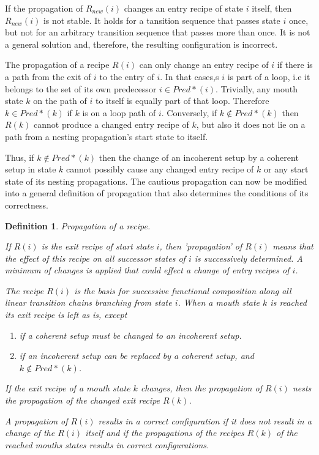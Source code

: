 \documentclass[12pt,a4paper]{scrartcl}
\newtheorem{definition}{Definition}
\begin{document}
If the propagation of $R_{new}(i)$ changes an entry recipe of state $i$ itself,
then $R_{new}(i)$ is not stable.  It holds for a tansition sequence that passes
state $i$ once, but not for an arbitrary transition sequence that passes more
than once.  It is not a general solution and, therefore, the resulting
configuration is incorrect.  

The propagation of a recipe $R(i)$ can only change an entry recipe of $i$ if
there is a path from the exit of $i$ to the entry of $i$. In that cases,s $i$
is part of a loop, i.e it belongs to the set of its own predecessor $i\in
Pred*(i)$. Trivially, any mouth state $k$ on the path of $i$ to itself is
equally part of that loop. Therefore $k\in Pred*(k)$ if $k$ is on a loop path
of $i$. Conversely, if $k\notin Pred*(k)$  then $R(k)$ cannot produce a changed
entry recipe of $k$, but also it does not lie on a path from a nesting
propagation's start state to itself. 

Thus, if $k\notin Pred*(k)$  then the change of an incoherent setup by a
coherent setup in state $k$ cannot possibly cause any changed entry recipe
of $k$ or any start state of its nesting propagations. The cautious propagation
can now be modified into a general definition of propagation that also
determines the conditions of its correctness.

\begin{definition} Propagation of a recipe.
    
    If $R(i)$ is the exit recipe of start state $i$, then 'propagation'
    of $R(i)$ means that the effect of this recipe on all successor states of
    $i$ is successively determined. A minimum of changes is applied that could
    effect a change of entry recipes of $i$.

    The recipe $R(i)$ is the basis for successive functional composition along
    all linear transition chains branching from state $i$. When a mouth state
    $k$ is reached its exit recipe is left as is, except 

    \begin{enumerate}
       \item if a coherent setup must be changed to an incoherent setup.
       \item if an incoherent setup can be replaced by a coherent setup, 
             and $k\notin Pred*(k)$.
    \end{enumerate}
    
    If the exit recipe of a  mouth state $k$ changes, then the propagation of
    $R(i)$ nests the propagation of the changed exit recipe $R(k)$. 

    A propagation of $R(i)$ results in a correct configuration if it does not
    result in a change of the $R(i)$ itself and if the propagations of the
    recipes $R(k)$ of the reached mouths states results in correct
    configurations.

\end{definition}
\end{document}
